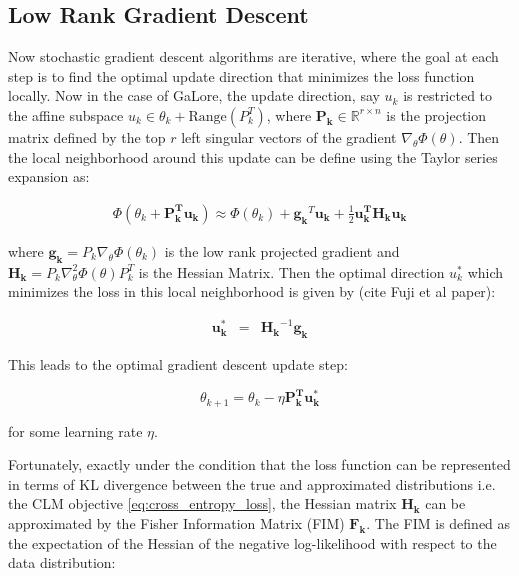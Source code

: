 \subsection{Low Rank Gradient Descent}

Now stochastic gradient descent algorithms are iterative, where the goal at each step is to find the optimal update direction that minimizes the loss function locally. Now in the case of GaLore, the update direction, say \(u_{k}\) is restricted to the affine subspace \(u_{k} \in {\theta_{k}} + \text{Range} \left(P_{k}^{T}\right)\), where \(\mathbf{P_{k}} \in \mathbb{R}^{r\times n}\) is the projection matrix defined by the top \(r\) left singular vectors of the gradient \(\nabla_{\theta} \Phi(\theta)\). Then the local neighborhood around this update can be define using the Taylor series expansion as:

\begin{eqnarray}
\Phi(\theta_{k} + \mathbf{P_{k}^T u_{k}}) \approx \Phi(\theta_{k}) + \mathbf{g_{k}}^{T}\mathbf{u_{k}} + \frac{1}{2} \mathbf{u_{k}^{T} \mathbf{H_{k}}  u_{k}}
\label{eq:taylor_series_expansion}
\end{eqnarray}

where \(\mathbf{g_{k}} = P_{k}\nabla_{\theta} \Phi(\theta_{k})\) is the low rank projected gradient and \(\mathbf{H_{k}} = P_{k}\nabla^2_{\theta} \Phi(\theta) P_{k}^T\) is the Hessian Matrix. Then the optimal direction \(u_{k}^{*}\) which minimizes the loss in this local neighborhood is given by (cite Fuji et al paper):

\begin{eqnarray}
\mathbf{u_{k}^{*}} &=& \mathbf{H_{k}}^{-1} \mathbf{g_{k}}
\label{eq:optimal_direction}
\end{eqnarray}

 This leads to the optimal gradient descent update step:

\[
\theta_{k+1} = \theta_{k} - \eta \mathbf{P_{k}^T u^*_{k}}
\label{eq:gradient_descent_update}
\]

for some learning rate \(\eta\).

Fortunately, exactly under the condition that the loss function can be represented in terms of KL divergence between the true and approximated distributions i.e. the CLM objective \ref{eq:cross_entropy_loss}, the Hessian matrix \(\mathbf{H_{k}}\) can be approximated by the Fisher Information Matrix (FIM) \(\mathbf{F_{k}}\). The FIM is defined as the expectation of the Hessian of the negative log-likelihood with respect to the data distribution:

